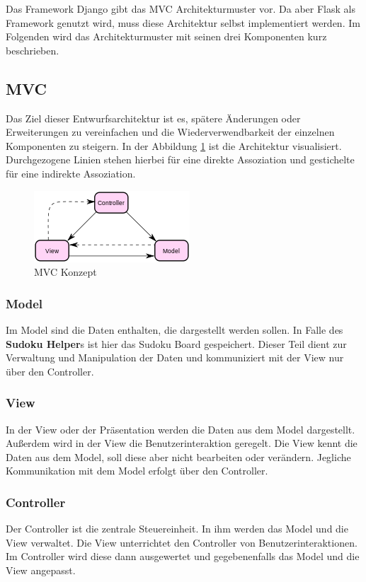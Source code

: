 Das Framework Django gibt das \ac{MVC} Architekturmuster vor. Da aber Flask als Framework genutzt wird, muss diese Architektur selbst implementiert werden. Im Folgenden wird das Architekturmuster mit seinen drei Komponenten kurz beschrieben.

\newpage

\subsection{\acl{MVC}}
\label{sub:mvc}
Das Ziel dieser Entwurfsarchitektur ist es, spätere Änderungen oder Erweiterungen zu vereinfachen und die Wiederverwendbarkeit der einzelnen Komponenten zu steigern. In der Abbildung \ref{fig:MVC} ist die Architektur visualisiert. Durchgezogene Linien stehen hierbei für eine direkte Assoziation und gestichelte für eine indirekte Assoziation.  \cite[57\psq]{musch2021design}

\begin{figure}[H]
	\centering
	\includegraphics{images/MVC.png}
	\caption{\ac{MVC} Konzept}
	\label{fig:MVC}
\end{figure}

\subsubsection{Model}
Im Model sind die Daten enthalten, die dargestellt werden sollen. In Falle des \textbf{Sudoku Helper}s ist hier das Sudoku Board gespeichert. Dieser Teil dient zur Verwaltung und Manipulation der Daten und kommuniziert mit der View nur über den Controller.

\subsubsection{View}
In der View oder der Präsentation werden die Daten aus dem Model dargestellt. Außerdem wird in der View die Benutzerinteraktion geregelt. Die View kennt die Daten aus dem Model, soll diese aber nicht bearbeiten oder verändern. Jegliche Kommunikation mit dem Model erfolgt über den Controller.

\subsubsection{Controller}
Der Controller ist die zentrale Steuereinheit. In ihm werden das Model und die View verwaltet. Die View unterrichtet den Controller von Benutzerinteraktionen. Im Controller wird diese dann ausgewertet und gegebenenfalls das Model und die View angepasst.
